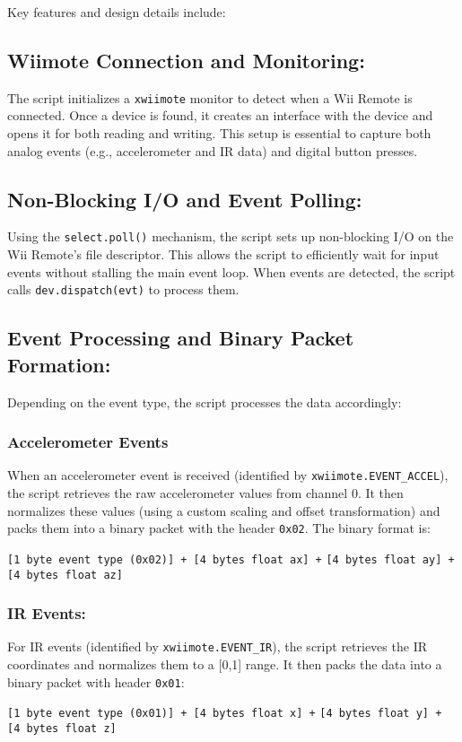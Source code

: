 Key features and design details include:

\subsection*{Wiimote Connection and Monitoring:}
The script initializes a \texttt{xwiimote} monitor to detect when a Wii Remote is connected. Once a device is found, it creates an interface with the device and opens it for both reading and writing. This setup is essential to capture both analog events (e.g., accelerometer and IR data) and digital button presses.

\subsection*{Non-Blocking I/O and Event Polling:}
Using the \texttt{select.poll()} mechanism, the script sets up non-blocking I/O on the Wii Remote’s file descriptor. This allows the script to efficiently wait for input events without stalling the main event loop. When events are detected, the script calls \texttt{dev.dispatch(evt)} to process them.

\subsection*{Event Processing and Binary Packet Formation:}
Depending on the event type, the script processes the data accordingly:
\subsubsection*{Accelerometer Events}
When an accelerometer event is received (identified by \texttt{xwiimote.EVENT\_ACCEL}), the script retrieves the raw accelerometer values from channel 0. It then normalizes these values (using a custom scaling and offset transformation) and packs them into a binary packet with the header \texttt{0x02}. The binary format is:
\begin{center}
	\texttt{[1 byte event type (0x02)] + [4 bytes float ax] +}
	\texttt{[4 bytes float ay] + [4 bytes float az]}
\end{center}
\subsubsection*{IR Events:}
For IR events (identified by \texttt{xwiimote.EVENT\_IR}), the script retrieves the IR coordinates and normalizes them to a [0,1] range. It then packs the data into a binary packet with header \texttt{0x01}:
\begin{center}
	\texttt{[1 byte event type (0x01)] + [4 bytes float x] +}
	\texttt{[4 bytes float y] + [4 bytes float z]}
\end{center}
